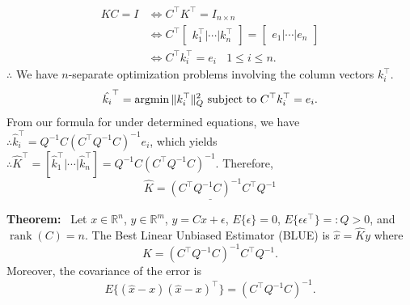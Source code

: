 \documentclass[letterpaper]{article}
\newcommand{\real}{\mathbb R}  %
\begin{document}
    \begin{align*}
        KC=I &\Leftrightarrow C^\top K^\top =I_{n\times n}\\
        &\Leftrightarrow C^\top \begin{bmatrix}k_1^\top|\dotsb|k_n^\top\end{bmatrix}=\begin{bmatrix}e_1|\dotsb|e_n\end{bmatrix}\\
        &\Leftrightarrow C^\top k_i^\top=e_i\ \ \ \ 1\leq i\leq n.
    \end{align*}
    $\therefore $ We have $n$-separate optimization problems involving the column vectors $k_i^\top $.
    \begin{equation*}
        \hat{k_i}^\top = \operatorname{argmin} \|k_i^\top \|_Q^2\textnormal{  subject to  } C^\top k_i^\top=e_i.
    \end{equation*}
    From our formula for under determined equations, we have
      \newline
    $\therefore \hat{k}_i^\top = Q^{-1}C(C^\top Q^{-1}C)^{-1}e_i$, which yields
    \newline
    $\therefore \hat{K}^\top = [\hat{k}_1^\top| \cdots |\hat{k}_n^\top]=Q^{-1}C(C^\top Q^{-1}C)^{-1}.$
    \newline
    Therefore,
    \begin{equation*}
        \underline{\hat{K}= (C^\top Q^{-1}C)^{-1}C^\top Q^{-1}}
    \end{equation*}


    \textbf{Theorem:}~ Let $x\in\real^n$, $y\in\real^m$, $y=Cx+\epsilon$, $E\{\epsilon\}=0$, $E\{\epsilon\epsilon^\top\}=:Q>0$, and $\operatorname{rank}(C)=n$. The Best Linear Unbiased Estimator (BLUE) is $\hat{x}=\hat{K}y$ where
    \begin{equation*}
        \hat{K}=\left(C^\top Q^{-1}C\right)^{-1}C^\top Q^{-1}.
    \end{equation*}
    Moreover, the covariance of the error is
    \begin{equation*}
        E\{\left(\hat{x}-x\right)\left(\hat{x}-x\right)^\top\}=\left(C^\top Q^{-1}C\right)^{-1}.
    \end{equation*}
\end{document}

